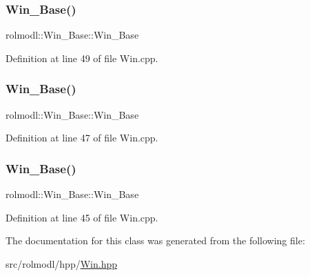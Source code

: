 \mbox{\label{classrolmodl_1_1_win_afb98cea3cee1b466a4bb51d275123238}} 
\subsubsection{\texorpdfstring{Win\_Base()}{Win\_Base()}\hspace{0.1cm}{\footnotesize\ttfamily [4/6]}}
{\footnotesize\ttfamily rolmodl\+::\+Win\+\_\+\+Base\+::\+Win\+\_\+\+Base}



Definition at line 49 of file Win.\+cpp.

\mbox{\label{classrolmodl_1_1_win_a520190cbd5064e620f0fca89eaae6f06}} 
\subsubsection{\texorpdfstring{Win\_Base()}{Win\_Base()}\hspace{0.1cm}{\footnotesize\ttfamily [5/6]}}
{\footnotesize\ttfamily rolmodl\+::\+Win\+\_\+\+Base\+::\+Win\+\_\+\+Base}



Definition at line 47 of file Win.\+cpp.

\mbox{\label{classrolmodl_1_1_win_aaa9e04d7aa993555afbdf34ab3fd92f0}} 
\subsubsection{\texorpdfstring{Win\_Base()}{Win\_Base()}\hspace{0.1cm}{\footnotesize\ttfamily [6/6]}}
{\footnotesize\ttfamily rolmodl\+::\+Win\+\_\+\+Base\+::\+Win\+\_\+\+Base}



Definition at line 45 of file Win.\+cpp.



The documentation for this class was generated from the following file\+:\begin{DoxyCompactItemize}
\item 
src/rolmodl/hpp/\mbox{\hyperlink{_win_8hpp}{Win.\+hpp}}\end{DoxyCompactItemize}
